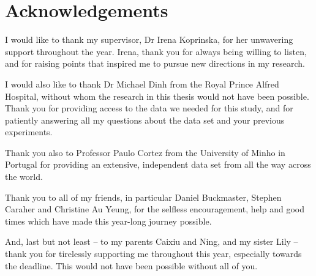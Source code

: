 \chapter*{Acknowledgements}

I would like to thank my supervisor, Dr Irena Koprinska, for her unwavering
support throughout the year. Irena, thank you for always being willing to
listen, and for raising points that inspired me to pursue new directions in
my research.

I would also like to thank Dr Michael Dinh from the Royal Prince Alfred
Hospital, without whom the research in this thesis would not have been
possible. Thank you for providing access to the data we needed for this study,
and for patiently answering all my questions about the data set and your
previous experiments.

Thank you also to Professor Paulo Cortez from the University of Minho in
Portugal for providing an extensive, independent data set from all the way
across the world.

Thank you to all of my friends, in particular Daniel Buckmaster, Stephen
Caraher and Christine Au Yeung, for the selfless encouragement, help and good
times which have made this year-long journey possible.

And, last but not least -- to my parents Caixiu and Ning, and
my sister Lily -- thank you for tirelessly supporting me throughout this year,
especially towards the deadline. This would not have been possible without all
of you.
